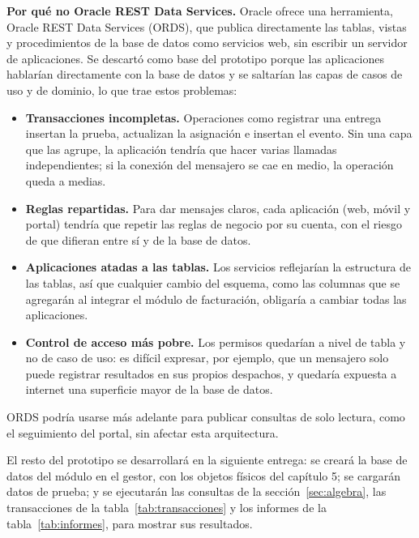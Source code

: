 \textbf{Por qué no Oracle REST Data Services.} Oracle ofrece una
herramienta, Oracle REST Data Services (ORDS), que publica directamente
las tablas, vistas y procedimientos de la base de datos como servicios
web, sin escribir un servidor de aplicaciones. Se descartó como base del
prototipo porque las aplicaciones hablarían directamente con la base de
datos y se saltarían las capas de casos de uso y de dominio, lo que trae
estos problemas:

\begin{itemize}[itemsep=2pt]
  \item \textbf{Transacciones incompletas.} Operaciones como registrar
        una entrega insertan la prueba, actualizan la asignación e
        insertan el evento. Sin una capa que las agrupe, la aplicación
        tendría que hacer varias llamadas independientes; si la conexión
        del mensajero se cae en medio, la operación queda a medias.
  \item \textbf{Reglas repartidas.} Para dar mensajes claros, cada
        aplicación (web, móvil y portal) tendría que repetir las reglas
        de negocio por su cuenta, con el riesgo de que difieran entre sí
        y de la base de datos.
  \item \textbf{Aplicaciones atadas a las tablas.} Los servicios
        reflejarían la estructura de las tablas, así que cualquier cambio
        del esquema, como las columnas que se agregarán al integrar el
        módulo de facturación, obligaría a cambiar todas las
        aplicaciones.
  \item \textbf{Control de acceso más pobre.} Los permisos quedarían a
        nivel de tabla y no de caso de uso: es difícil expresar, por
        ejemplo, que un mensajero solo puede registrar resultados en sus
        propios despachos, y quedaría expuesta a internet una superficie
        mayor de la base de datos.
\end{itemize}

ORDS podría usarse más adelante para publicar consultas de solo lectura,
como el seguimiento del portal, sin afectar esta arquitectura.

El resto del prototipo se desarrollará en la siguiente entrega: se
creará la base de datos del módulo en el gestor, con los objetos físicos
del capítulo 5; se cargarán datos de prueba; y se ejecutarán las
consultas de la sección~\ref{sec:algebra}, las transacciones de la
tabla~\ref{tab:transacciones} y los informes de la
tabla~\ref{tab:informes}, para mostrar sus resultados.
